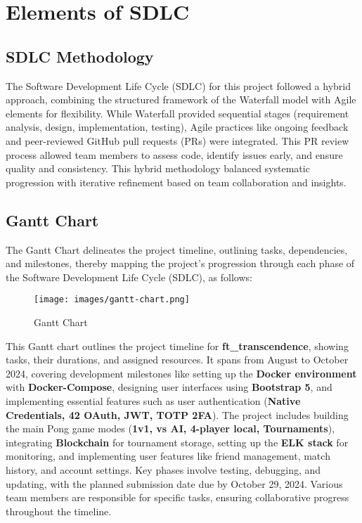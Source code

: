 \chapter{Elements of SDLC}

\section{SDLC Methodology}

The Software Development Life Cycle (SDLC) for this project followed a hybrid approach, combining the structured framework of the Waterfall model with Agile elements for flexibility. While Waterfall provided sequential stages (requirement analysis, design, implementation, testing), Agile practices like ongoing feedback and peer-reviewed GitHub pull requests (PRs) were integrated. This PR review process allowed team members to assess code, identify issues early, and ensure quality and consistency. This hybrid methodology balanced systematic progression with iterative refinement based on team collaboration and insights.

\section{Gantt Chart}
The Gantt Chart delineates the project timeline, outlining tasks, dependencies, and milestones, thereby mapping the project’s progression through each phase of the Software Development Life Cycle (SDLC), as follows:

\begin{figure}[H]
    \texttt{[image: images/gantt-chart.png]}
    \caption{Gantt Chart}
    \label{fig:gantt-chart}
\end{figure}

This Gantt chart outlines the project timeline for \textbf{ft\_transcendence}, showing tasks, their durations, and assigned resources. It spans from August to October 2024, covering development milestones like setting up the \textbf{Docker environment} with \textbf{Docker-Compose}, designing user interfaces using \textbf{Bootstrap 5}, and implementing essential features such as user authentication (\textbf{Native Credentials, 42 OAuth, JWT, TOTP 2FA}). The project includes building the main Pong game modes (\textbf{1v1, vs AI, 4-player local, Tournaments}), integrating \textbf{Blockchain} for tournament storage, setting up the \textbf{ELK stack} for monitoring, and implementing user features like friend management, match history, and account settings. Key phases involve testing, debugging, and updating, with the planned submission date due by October 29, 2024. Various team members are responsible for specific tasks, ensuring collaborative progress throughout the timeline.



